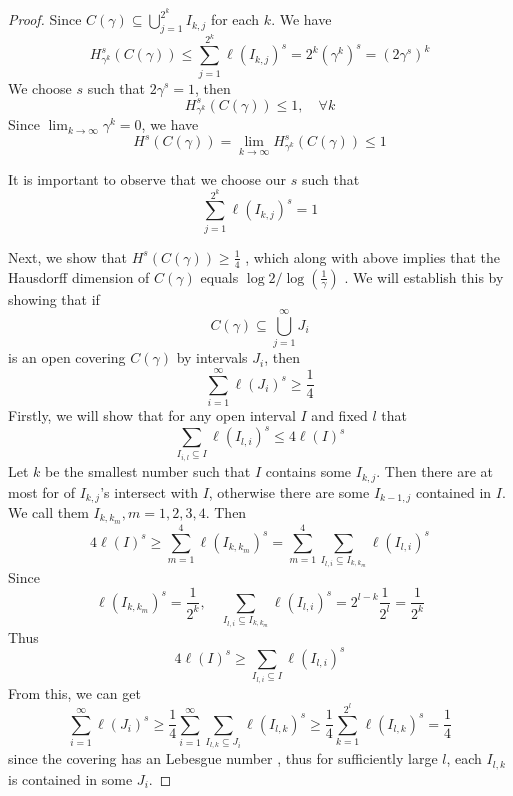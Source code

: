 \documentclass[../main.tex]{subfiles}
\begin{document}
\begin{proof}
    Since \(  C\left(  \gamma  \right)\subseteq \bigcup _{j= 1}^{2^{k}}I_{k,j}   \)  for each \(  k  \). We have  \[
    H^{s}_{ \gamma ^{k}}\left( C\left(  \gamma  \right)  \right) \le \sum _{j= 1}^{2^{k}} \ell\left( I_{k,j} \right) ^{s}= 2^{k}\left(  \gamma ^{k} \right)^{s}=  \left( 2 \gamma ^{s} \right)^{k}  
    \] We choose \(  s  \) such that \(  2 \gamma ^{s}= 1  \), then    \[
    H^{s}_{ \gamma ^{k}}\left( C\left(  \gamma  \right)  \right)\le  1,\quad \forall k 
    \] Since \(  \lim_{k\to \infty} \gamma ^{k}= 0  \), we have \[
    H^{s}\left( C\left(  \gamma  \right)  \right)= \lim_{k\to \infty}H^{s}_{ \gamma ^{k}}\left( C\left(  \gamma  \right)  \right)\le 1  
    \]  

    It is important to observe that we choose our \(  s  \) such that \[
    \sum _{j= 1}^{2^{k}}  \ell\left( I_{k,j} \right)^{s}= 1 
    \] 

    Next, we show that \(  H^{s}\left( C\left(  \gamma  \right)  \right)\ge \frac{1 }{4 }    \) , which along with above implies that the Hausdorff dimension of \(  C\left(  \gamma  \right)   \) equals \(  \log 2 / \log\left( \frac{1 }{ \gamma  }  \right)   \) . We will establish this by showing that if \[
    C\left(  \gamma  \right)\subseteq \bigcup _{j= 1}^{\infty}J_{i} 
    \] is an open covering \(  C\left(  \gamma  \right)   \) by intervals \(  J_{i}  \), then \[
    \sum _{i= 1}^{\infty} \ell\left( J_{i} \right)^{s}\ge \frac{1 }{4 }  
    \] Firstly, we will show that for any open interval \(  I  \) and fixed \(   l  \) that \[
    \sum _{I_{i,l}\subseteq I} \ell\left( I_{l,i} \right)^{s}\le 4 \ell\left( I \right)^{s}  
    \]    Let \(  k  \) be the smallest number    such that \(  I  \) contains some \(  I_{k,j}  \). Then there are at most for of \(  I_{k,j}  \)'s intersect with \(  I  \), otherwise there are some \(  I_{k-1,j}  \) contained in \(  I  \). We call them \(  I_{k,k_{m}},m = 1,2,3,4  \).  Then \[
    4 \ell\left( I \right)^{s} \ge \sum _{m= 1}^{4} \ell\left( I_{k,k_{m}} \right)^{s}=  \sum _{m= 1}^{4}\sum _{I_{l,i}\subseteq I_{k,k_{m}}}  \ell\left( I_{l,i} \right)^{s} 
    \]    Since \[
     \ell\left( I_{k,k_{m}} \right)^{s}= \frac{1 }{2^{k} },\quad  \sum _{I_{l,i}\subseteq I_{k,k_{m}}}   \ell\left( I_{l,i} \right)^{s}= 2^{l-k}\frac{1 }{2^{l} }= \frac{1 }{2^{k} }   
    \]  Thus \[
    4 \ell\left( I \right)^{s}\ge \sum _{I_{l,i}\subseteq I} \ell\left( I_{l,i} \right)^{s}  
    \] From this, we can get \[
    \sum _{i= 1}^{\infty} \ell\left( J_{i} \right)^{s}\ge  \frac{1 }{4 }\sum _{i= 1}^{\infty}\sum _{I_{l,k}\subseteq J_{i}} \ell\left( I_{l,k} \right)^{s}  \ge \frac{1 }{4 }\sum _{k= 1}^{2^{l}} \ell\left( I_{l,k} \right)^{s}= \frac{1 }{4 }   
    \] since the covering has an Lebesgue number , thus for sufficiently large \(  l  \), each \(  I_{l,k}  \) is contained in some \(  J_{i}  \).   
\end{proof}
\end{document}

